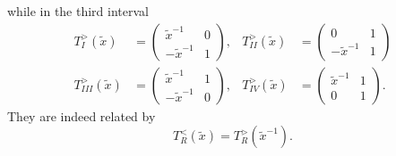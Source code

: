 \documentclass[12pt,reqno]{amsart}
\theoremstyle{definition}
\def\tx{\tilde{x}}
\def\-{\,-\,}
\def\tx{\tilde{x}}
\begin{document}
while in the third interval
\begin{align}
  T^{>}_{I}(\tx) &=
    \begin{pmatrix}
      \tx^{-1}&0\\
      -\tx^{-1}&1
    \end{pmatrix},  &
              T^{>}_{II}(\tx) &=
                \begin{pmatrix}
                  0&1\\-\tx^{-1}&1
                \end{pmatrix}\\
  T^{>}_{III}(\tx) &=
    \begin{pmatrix}
      \tx^{-1}&1\\
      -\tx^{-1}&0
    \end{pmatrix}, &
              T^{>}_{IV}(\tx) &=
                \begin{pmatrix}
                  \tx^{-1}&1\\0&1
                \end{pmatrix}.
\end{align}
They are indeed related by
\begin{equation}
  T^{<}_R(\tx) = T^{>}_R(\tx^{-1}).
  \label{eq:Tgtrless}
\end{equation}
\end{document}
